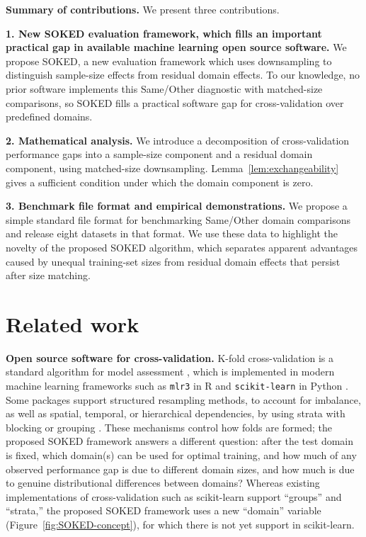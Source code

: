 \documentclass[twoside]{article}
\begin{document}
\textbf{Summary of contributions.}
We present three contributions.

\textbf{1. New SOKED evaluation framework, which fills an important practical gap in available machine learning open source software.}
  We propose SOKED, a new evaluation framework which uses downsampling to distinguish sample-size effects from residual domain effects.
  To our knowledge, no prior software implements this Same/Other diagnostic with matched-size comparisons, so SOKED fills a practical software gap for cross-validation over predefined domains.


\textbf{2. Mathematical analysis.}
  We introduce a decomposition of cross-validation performance gaps into a sample-size component and a residual domain component, using matched-size downsampling.
  Lemma~\ref{lem:exchangeability} gives a sufficient condition under which the domain component is zero.

\textbf{3. Benchmark file format and empirical demonstrations.}
  We propose a simple standard file format for benchmarking Same/Other domain comparisons and release eight datasets in that format.
  We use these data to highlight the novelty of the proposed SOKED algorithm, which separates apparent advantages caused by unequal training-set sizes from residual domain effects that persist after size matching.


\section{Related work}

\textbf{Open source software for cross-validation.} K-fold cross-validation is a standard algorithm for model assessment \citep{stone1974cross,geisser1975predictive,Arl_Cel:2010:surveyCV}, which is implemented in modern machine learning frameworks such as \texttt{mlr3} in R and \texttt{scikit-learn} in Python \citep{Bischl2024,scikit-learn}.
Some packages support structured resampling methods, to account for imbalance, as well as spatial, temporal, or hierarchical dependencies, by using strata with blocking or grouping \citep{roberts2017,brenning2005,valavi2019,schratz2024}.
These mechanisms control how folds are formed; the proposed SOKED framework answers a different question: after the test domain is fixed, which domain(s) can be used for optimal training, and how much of any observed performance gap is due to different domain sizes, and how much is due to genuine distributional differences between domains?
Whereas existing implementations of cross-validation such as scikit-learn support ``groups'' and ``strata,'' the proposed SOKED framework uses a new ``domain'' variable (Figure~\ref{fig:SOKED-concept}), for which there is not yet support in scikit-learn.
\end{document}

